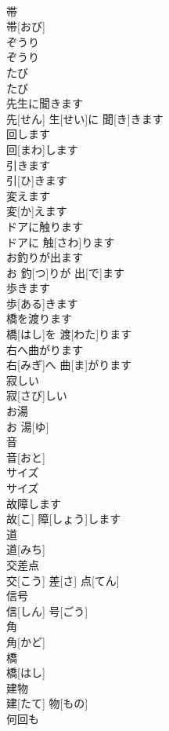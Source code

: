 \documentclass[8pt]{extreport}
\begin{document}
\begin{CJK}{UTF8}{min}
\\	帯	
\\	帯[おび]		
\\	ぞうり	
\\	ぞうり		
\\	たび	
\\	たび		
\\	先生に聞きます	
\\	先[せん] 生[せい]に 聞[き]きます		
\\	回します	
\\	回[まわ]します		
\\	引きます	
\\	引[ひ]きます		
\\	変えます	
\\	変[か]えます		
\\	ドアに触ります	
\\	ドアに 触[さわ]ります		
\\	お釣りが出ます	
\\	お 釣[つ]りが 出[で]ます		
\\	歩きます	
\\	歩[ある]きます		
\\	橋を渡ります	
\\	橋[はし]を 渡[わた]ります		
\\	右へ曲がります	
\\	右[みぎ]へ 曲[ま]がります		
\\	寂しい	
\\	寂[さび]しい		
\\	お湯	
\\	お 湯[ゆ]		
\\	音	
\\	音[おと]		
\\	サイズ	
\\	サイズ		
\\	故障します	
\\	故[こ] 障[しょう]します		
\\	道	
\\	道[みち]		
\\	交差点	
\\	交[こう] 差[さ] 点[てん]		
\\	信号	
\\	信[しん] 号[ごう]		
\\	角	
\\	角[かど]		
\\	橋	
\\	橋[はし]		
\\	建物	
\\	建[たて] 物[もの]		
\\	何回も	

\end{CJK}
\end{document}
